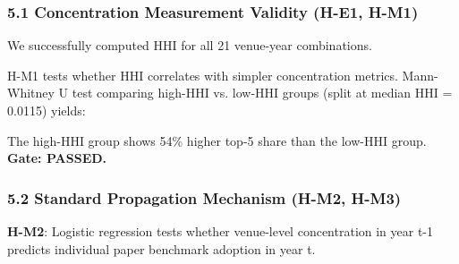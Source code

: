 
\subsubsection{5.1 Concentration Measurement Validity (H-E1, H-M1)}

We successfully computed HHI for all 21 venue-year combinations.

\begin{table}[htbp]
\centering
{}
\end{table}

H-M1 tests whether HHI correlates with simpler concentration metrics. Mann-Whitney U test comparing high-HHI vs. low-HHI groups (split at median HHI = 0.0115) yields:

\begin{table}[htbp]
\centering
{}
\end{table}

The high-HHI group shows 54\% higher top-5 share than the low-HHI group. \textbf{Gate: PASSED.}

\subsubsection{5.2 Standard Propagation Mechanism (H-M2, H-M3)}

\textbf{H-M2}: Logistic regression tests whether venue-level concentration in year t-1 predicts individual paper benchmark adoption in year t.

